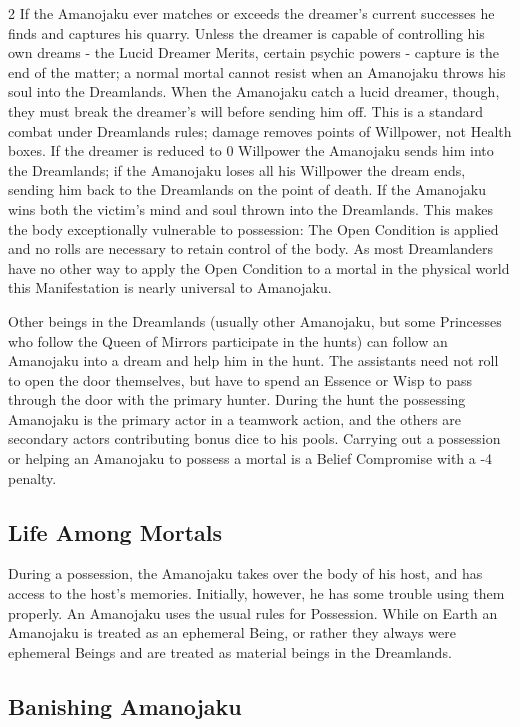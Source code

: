\begin{multicols}{2}
If the Amanojaku ever matches or exceeds the dreamer's current successes he finds and captures his quarry. Unless the dreamer is capable of controlling his own dreams - the Lucid Dreamer Merits, certain psychic powers - capture is the end of the matter; a normal mortal cannot resist when an Amanojaku throws his soul into the Dreamlands. When the Amanojaku catch a lucid dreamer, though, they must break the dreamer's will before sending him off. This is a standard combat under Dreamlands rules; damage removes points of Willpower, not Health boxes. If the dreamer is reduced to 0 Willpower the Amanojaku sends him into the Dreamlands; if the Amanojaku loses all his Willpower the dream ends, sending him back to the Dreamlands on the point of death. If the Amanojaku wins both the victim's mind and soul thrown into the Dreamlands. This makes the body exceptionally vulnerable to possession: The Open Condition is applied and no rolls are necessary to retain control of the body. As most Dreamlanders have no other way 
to apply the Open Condition to a mortal in the physical world this Manifestation is nearly universal to Amanojaku.

Other beings in the Dreamlands (usually other Amanojaku, but some Princesses who follow the Queen of Mirrors participate in the hunts) can follow an Amanojaku into a dream and help him in the hunt. The assistants need not roll to open the door themselves, but have to spend an Essence or Wisp to pass through the door with the primary hunter. During the hunt the possessing Amanojaku is the primary actor in a teamwork action, and the others are secondary actors contributing bonus dice to his pools. Carrying out a possession or helping an Amanojaku to possess a mortal is a Belief Compromise with a -4 penalty. 

\subsection*{Life Among Mortals}

During a possession, the Amanojaku takes over the body of his host, and has access to the host's memories. Initially, however, he has some trouble using them properly. An Amanojaku uses the usual rules for Possession. While on Earth an Amanojaku is treated as an ephemeral Being, or rather they always were ephemeral Beings and are treated as material beings in the Dreamlands. 

\subsection*{Banishing Amanojaku}


\end{multicols}
